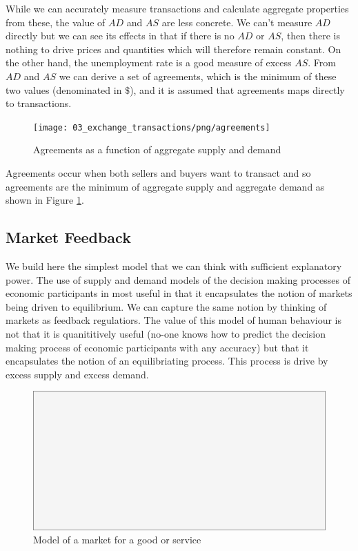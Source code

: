 While we can accurately measure transactions and calculate aggregate properties from these, the
value of $AD$ and $AS$ are less concrete. We can't measure $AD$ directly but we can see its effects
in that if there is no $AD$ or $AS$, then there is nothing to drive prices and quantities which will
therefore remain constant. On the other hand, the unemployment rate is a good measure of excess
$AS$. From $AD$ and $AS$ we can derive a set of agreements, which is the minimum of these two values
(denominated in $\$$), and it is assumed that agreements maps directly to transactions.

\begin{figure}[H]
\centering
\texttt{[image: 03\_exchange\_transactions/png/agreements]}
\caption{Agreements as a function of aggregate supply and demand}
\label{fig:agreements}
\end{figure}

Agreements occur when both sellers and buyers want to transact and so agreements are the minimum of
aggregate supply and aggregate demand as shown in Figure \ref{fig:agreements}.

\subsection{Market Feedback}  
\label{section:market_feedback}

We build here the simplest model that we can think with sufficient explanatory power. The use of
supply and demand models of the decision making processes of economic participants in most useful in
that it encapsulates the notion of markets being driven to equilibrium. We can capture the same
notion by thinking of markets as feedback regulatiors. The value of this model of human behaviour is
not that it is quanititively useful (no-one knows how to predict the decision making process of
economic participants with any accuracy) but that it encapsulates the notion of an equilibriating
process. This process is drive by excess supply and excess demand.

\begin{figure}[H]
\centering
\includegraphics[scale=0.48]{blank}
\caption{Model of a market for a good or service}
\label{fig:micro_feedback}
\end{figure}

